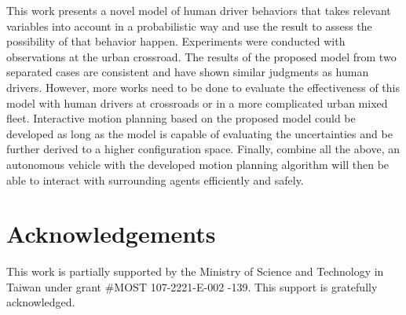 \documentclass[twocolumn,10pt]{asme2e}
\begin{document}
This work presents a novel model of human driver behaviors that takes relevant variables into account in a probabilistic way and use the result to assess the possibility of that behavior happen. Experiments were conducted with observations at the urban crossroad. The results of the proposed model from two separated cases are consistent and have shown similar judgments as human drivers. However, more works need to be done to evaluate the effectiveness of this model with human drivers at crossroads or in a more complicated urban mixed fleet. Interactive motion planning based on the proposed model could be developed as long as the model is capable of evaluating the uncertainties and be further derived to a higher configuration space. Finally, combine all the above, an autonomous vehicle with the developed motion planning algorithm will then be able to interact with surrounding agents efficiently and safely.

\section{Acknowledgements}
This work is partially supported by the Ministry of Science and Technology in Taiwan under grant #MOST 107-2221-E-002 -139. This support is gratefully acknowledged.





%


\end{document}
